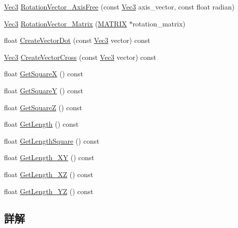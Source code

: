 \begin{DoxyCompactItemize}
\item 
\mbox{\hyperlink{_vector3_d_8h_ab16f59e4393f29a01ec8b9bbbabbe65d}{Vec3}} \mbox{\hyperlink{class_vector3_d_aadbe9f3e0ee3298c59cf123b592140bd}{Rotation\+Vector\+\_\+\+Axis\+Free}} (const \mbox{\hyperlink{_vector3_d_8h_ab16f59e4393f29a01ec8b9bbbabbe65d}{Vec3}} axis\+\_\+vector, const float radian)
\item 
\mbox{\hyperlink{_vector3_d_8h_ab16f59e4393f29a01ec8b9bbbabbe65d}{Vec3}} \mbox{\hyperlink{class_vector3_d_aa368719da4c1ac4e8a727edbd09ec390}{Rotation\+Vector\+\_\+\+Matrix}} (\mbox{\hyperlink{_vector3_d_8h_a032295cd9fb1b711757c90667278e744}{M\+A\+T\+R\+IX}} $\ast$rotation\+\_\+matrix)
\item 
float \mbox{\hyperlink{class_vector3_d_aed4c9936346cfbcb7238bd64ae1601d3}{Create\+Vector\+Dot}} (const \mbox{\hyperlink{_vector3_d_8h_ab16f59e4393f29a01ec8b9bbbabbe65d}{Vec3}} vector) const
\item 
\mbox{\hyperlink{_vector3_d_8h_ab16f59e4393f29a01ec8b9bbbabbe65d}{Vec3}} \mbox{\hyperlink{class_vector3_d_accbd42535a385947ac5380084f2c688c}{Create\+Vector\+Cross}} (const \mbox{\hyperlink{_vector3_d_8h_ab16f59e4393f29a01ec8b9bbbabbe65d}{Vec3}} vector) const
\item 
float \mbox{\hyperlink{class_vector3_d_a77ee5fc836fd4024bd8bdae603b1677e}{Get\+SquareX}} () const
\item 
float \mbox{\hyperlink{class_vector3_d_a151d4791ff98d3f99d038c1dc372e0fc}{Get\+SquareY}} () const
\item 
float \mbox{\hyperlink{class_vector3_d_a8ede9efe34b69e067153688aea96574f}{Get\+SquareZ}} () const
\item 
float \mbox{\hyperlink{class_vector3_d_a8b10872079076291bbbc81b7d48aa514}{Get\+Length}} () const
\item 
float \mbox{\hyperlink{class_vector3_d_a0d486a19d3f7515e2f147c78bb73ce07}{Get\+Length\+Square}} () const
\item 
float \mbox{\hyperlink{class_vector3_d_abaf2a0ccb78fdf2c3a393959e9c29708}{Get\+Length\+\_\+\+XY}} () const
\item 
float \mbox{\hyperlink{class_vector3_d_ae61982f6eb062257652f624ab1801089}{Get\+Length\+\_\+\+XZ}} () const
\item 
float \mbox{\hyperlink{class_vector3_d_a183854c5c7ea8bf32f752a02cf3fc3ce}{Get\+Length\+\_\+\+YZ}} () const
\end{DoxyCompactItemize}


\subsection{詳解}


